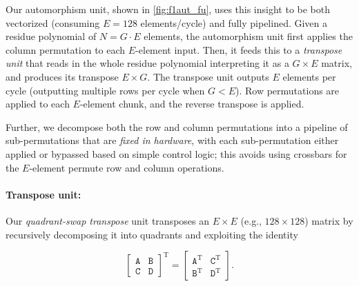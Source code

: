 \figFOneautfu

Our automorphism unit, shown in \autoref{fig:f1aut_fu}, uses this insight to be
both vectorized (consuming $E=128$ elements/cycle) and fully pipelined. Given a
residue polynomial of $N=G\cdot E$ elements, the automorphism unit first
applies the column permutation to each $E$-element input. Then, it feeds this
to a \emph{transpose unit} that reads in the whole residue polynomial
interpreting it as a $G\times E$ matrix, and produces its transpose $E\times
G$. The transpose unit outputs $E$ elements per cycle (outputting multiple rows
per cycle when $G < E$). Row permutations are applied to each $E$-element
chunk, and the reverse transpose is applied.

Further, we decompose both the row and column permutations into a pipeline of
sub-permutations that are \textit{fixed in hardware}, with each sub-permutation
either applied or bypassed based on simple control logic; this avoids using
crossbars for the $E$-element permute row and column operations.

\figFOneQuadrantSwap

\paragraph{Transpose unit:}
Our \textit{quadrant-swap transpose} unit transposes an $E \times E$ (e.g.,
$128\times 128$) matrix by recursively decomposing it into quadrants and
exploiting the identity

\begin{equation*}
  \left[ \begin{array}{c|c}
      \texttt{A} & \texttt{B}\\
      \hline
      \texttt{C} & \texttt{D}
  \end{array}\right]^{\textrm{T}} =   \left[ \begin{array}{c|c}
      \texttt{A}^{\textrm{T}} & \texttt{C}^{\textrm{T}} \\
      \hline
      \texttt{B}^{\textrm{T}} & \texttt{D}^{\textrm{T}}
  \end{array}\right].
\end{equation*}

